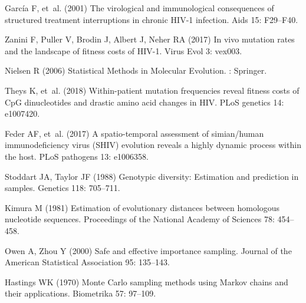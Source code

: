\documentclass[11pt]{article}
\begin{document}
{\begin{thebibliography}{10}
Garc{\'i}a F, et~al. (2001) The virological and immunological consequences of
  structured treatment interruptions in chronic {{HIV}}-1 infection.
\newblock Aids 15: F29--F40.

Zanini F, Puller V, Brodin J, Albert J, Neher RA (2017) {In vivo mutation rates
  and the landscape of fitness costs of HIV-1.}
\newblock Virus Evol 3: vex003.

Nielsen R (2006) Statistical Methods in Molecular Evolution.
: {Springer}.

Theys K, et~al. (2018) Within-patient mutation frequencies reveal fitness costs
  of {{CpG}} dinucleotides and drastic amino acid changes in {{HIV}}.
\newblock PLoS genetics 14: e1007420.

Feder AF, et~al. (2017) A spatio-temporal assessment of simian/human
  immunodeficiency virus ({{SHIV}}) evolution reveals a highly dynamic process
  within the host.
\newblock PLoS pathogens 13: e1006358.

Stoddart JA, Taylor JF (1988) Genotypic diversity: Estimation and prediction in
  samples.
\newblock Genetics 118: 705--711.

Kimura M (1981) Estimation of evolutionary distances between homologous
  nucleotide sequences.
\newblock Proceedings of the National Academy of Sciences 78: 454--458.

Owen A, Zhou Y (2000) Safe and effective importance sampling.
\newblock Journal of the American Statistical Association 95: 135--143.

Hastings WK (1970) Monte {{Carlo}} sampling methods using {{Markov}} chains and
  their applications.
\newblock Biometrika 57: 97--109.


\end{thebibliography}}
\end{document}

